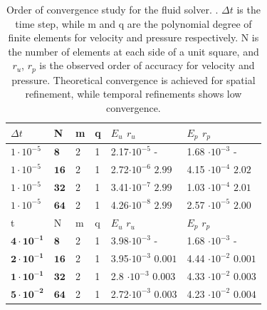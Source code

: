 \begin{table}[h!]
\centering
 \begin{tabular}{|p{1.5cm}|p{0.8cm}|p{0.8cm}|p{0.8cm}|p{3.7cm}|p{3.7cm}|}
   \hline
$\Delta t$ & N & m & q  & $E_u$ \hspace{16mm}  $r_u$ & $E_p$ \hspace{16mm} $r_p$ \\
   \hline
$1 \cdot 10^{-5}$  &$\mathbf{8}$  &2 &1 &2.17$\cdot 10^{-5}$ \hspace{6mm} -&1.68 $\cdot 10^{-3}$ \hspace{8mm}- \\
\hline
$1 \cdot 10^{-5}$  & $\mathbf{16}$&2 &1 &2.72$\cdot 10^{-6}$ \hspace{3mm} $\mathbf{2.99}$ & 4.15 $\cdot 10^{-4}$ \hspace{4mm} $\mathbf{2.02}$ \\
\hline
$1 \cdot 10^{-5}$  & $\mathbf{32}$&2 &1 &3.41$\cdot 10^{-7}$ \hspace{3mm} $\mathbf{2.99}$ & 1.03 $\cdot 10^{-4}$ \hspace{4mm} $\mathbf{2.01}$ \\
\hline
$1 \cdot 10^{-5}$  & $\mathbf{64}$&2 &1 &4.26$\cdot 10^{-8}$ \hspace{3mm} $\mathbf{2.99}$ &2.57 $\cdot 10^{-5}$ \hspace{4mm} $\mathbf{2.00}$ \\
\hline   \hline
t & N & m & q  & $E_u$ \hspace{16mm}  $r_u$ & $E_p$ \hspace{16mm} $r_p$ \\
   \hline
$\mathbf{4 \cdot 10^{-1}}$  & $\mathbf{8}$   &2 &1 &3.98$\cdot 10^{-3}$ \hspace{7mm} -&1.68 $\cdot 10^{-3}$ \hspace{6mm}- \\
\hline
$\mathbf{2 \cdot 10^{-1}}$  & $\mathbf{16}$&2 &1 &3.95$\cdot 10^{-3}$ \hspace{3mm} $\mathbf{0.001}$ & 4.44 $\cdot 10^{-2}$ \hspace{3mm} $\mathbf{0.001}$ \\
\hline
$\mathbf{1 \cdot 10^{-1}}$  & $\mathbf{32}$&2 &1 &2.8 $\cdot 10^{-3}$ \hspace{3mm} $\mathbf{0.003}$ & 4.33 $\cdot 10^{-2}$ \hspace{3mm} $\mathbf{0.003}$ \\
\hline
$\mathbf{5 \cdot 10^{-2}}$  & $\mathbf{64}$&2 &1 &2.72$\cdot 10^{-3}$ \hspace{3mm} $\mathbf{0.003}$ &4.23 $\cdot 10^{-2}$ \hspace{3mm} $\mathbf{0.004}$ \\
\end{tabular}
\caption{Order of convergence study for the fluid solver. . $\Delta t$ is the time step, while m and q are the  polynomial degree of finite elements for velocity and pressure respectively. N is the number of elements at each side of a unit square, and $r_u$, $r_p$ is the observed order of accuracy for velocity and pressure. Theoretical convergence is achieved for spatial refinement, while temporal refinements shows low convergence.}
\label{table:conv1}
\end{table}
